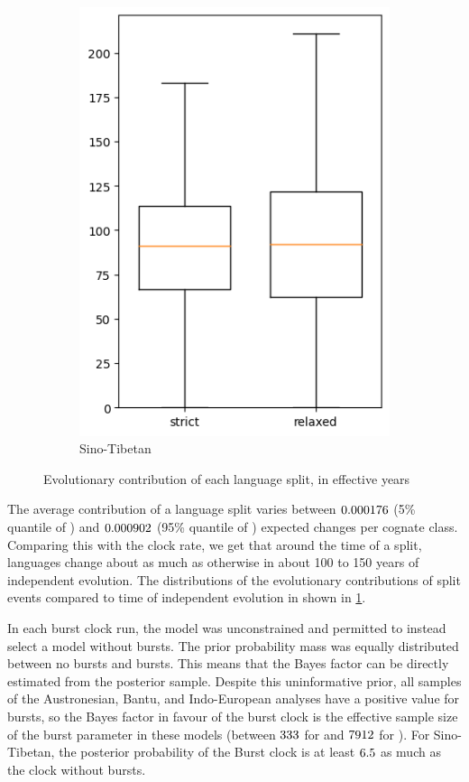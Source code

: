 \documentclass[]{rsos}%
\begin{document}
\begin{figure}
\begin{subfigure}{0.4\textwidth}
    \includegraphics[width=\textwidth]{supplement/analysis/sinotibetan_years_per_split.png}
    \caption{Sino-Tibetan}
  \end{subfigure}
  \caption{Evolutionary contribution of each language split, in effective years}
  \label{f:peryear}
\end{figure}


The average contribution of a language split varies between $0.000176$ (5\%
quantile of \minn) and $0.000902$ (95\% quantile of \maxn)
expected changes per cognate class. Comparing this with the clock rate, we get
that around the time of a split, languages change about as much as otherwise in
about 100 to 150 years of independent evolution. The distributions of the
evolutionary contributions of split events compared to time of independent
evolution in shown in \cref{f:peryear}.

In each burst clock run, the model was unconstrained and permitted to instead
select a model without bursts. The prior probability mass was equally distributed
between no bursts and bursts. This means that the Bayes factor can be directly estimated from the posterior sample.
Despite this uninformative prior, all samples of the
Austronesian, Bantu, and Indo-European analyses have a positive value for bursts,
so the Bayes factor in favour of the burst clock is the effective sample size of
the burst parameter in these models (between $333$ for \minessn{} and
$7912$ for \maxessn{}). For Sino-Tibetan,
the posterior probability of the Burst clock is at least $6.5$ as much as the clock
without bursts.
\end{document}
